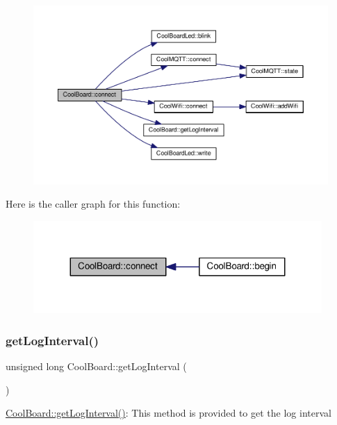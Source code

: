 \begin{figure}[H]
\begin{center}
\leavevmode
\includegraphics[width=350pt]{classCoolBoard_a519de78b807f8ec6463ff484eb925918_cgraph}
\end{center}
\end{figure}
Here is the caller graph for this function\+:
\nopagebreak
\begin{figure}[H]
\begin{center}
\leavevmode
\includegraphics[width=311pt]{classCoolBoard_a519de78b807f8ec6463ff484eb925918_icgraph}
\end{center}
\end{figure}
\mbox{\label{classCoolBoard_a7508e029f2ee17bb747ffab599285e0d}} 
\subsubsection{\texorpdfstring{get\+Log\+Interval()}{getLogInterval()}}
{\footnotesize\ttfamily unsigned long Cool\+Board\+::get\+Log\+Interval (\begin{DoxyParamCaption}{ }\end{DoxyParamCaption})}

\hyperlink{classCoolBoard_a7508e029f2ee17bb747ffab599285e0d}{Cool\+Board\+::get\+Log\+Interval()}\+: This method is provided to get the log interval

